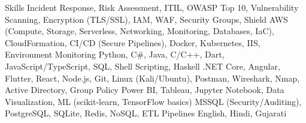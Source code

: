 \begin{rubric}{Skills}
Incident Response, Risk Assessment, ITIL, OWASP Top 10, Vulnerability Scanning, Encryption (TLS/SSL), IAM, WAF, Security Groups, Shield
AWS (Compute, Storage, Serverless, Networking, Monitoring, Databases, IaC), CloudFormation, CI/CD (Secure Pipelines), Docker, Kubernetes, IIS, Environment Monitoring
\entry*[Programming]
Python, C\#, Java, C/C++, Dart, JavaScript/TypeScript, SQL, Shell Scripting, Haskell
.NET Core, Angular, Flutter, React, Node.js, Git, Linux (Kali/Ubuntu), Postman, Wireshark, Nmap, Active Directory, Group Policy
Power BI, Tableau, Jupyter Notebook, Data Visualization, ML (scikit-learn, TensorFlow basics)
\entry*[Databases]
MSSQL (Security/Auditing), PostgreSQL, SQLite, Redis, NoSQL, ETL Pipelines
\entry*[Languages]
English, Hindi, Gujarati
\end{rubric}
